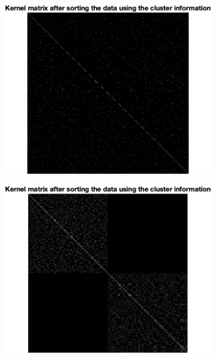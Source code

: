\documentclass[a4paper, 11pt, one column]{article}
\begin{document}
\begin{figure}[]
        \begin{subfigure}{0.33\textwidth}
            \includegraphics[width=\linewidth]{images/untitled21.png}
        \end{subfigure}\hfil
        \begin{subfigure}{0.33\textwidth}
            \includegraphics[width=\linewidth]{images/6.png}
        \end{subfigure}\hfil
        \begin{subfigure}{0.33\textwidth}

\end{subfigure}
\end{figure}
\end{document}

